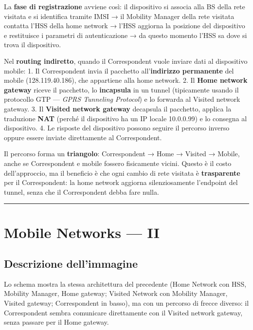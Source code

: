 \documentclass[
  italian,
  openany]{book}
\begin{document}
La \textbf{fase di registrazione} avviene così: il dispositivo si
associa alla BS della rete visitata e si identifica tramite IMSI → il
Mobility Manager della rete visitata contatta l'HSS della home network →
l'HSS aggiorna la posizione del dispositivo e restituisce i parametri di
autenticazione → da questo momento l'HSS sa dove si trova il
dispositivo.

Nel \textbf{routing indiretto}, quando il Correspondent vuole inviare
dati al dispositivo mobile: 1. Il Correspondent invia il pacchetto
all'\textbf{indirizzo permanente} del mobile (128.119.40.186), che
appartiene alla home network. 2. Il \textbf{Home network gateway} riceve
il pacchetto, lo \textbf{incapsula} in un tunnel (tipicamente usando il
protocollo GTP --- \emph{GPRS Tunneling Protocol}) e lo forwarda al
Visited network gateway. 3. Il \textbf{Visited network gateway}
decapsula il pacchetto, applica la traduzione \textbf{NAT} (perché il
dispositivo ha un IP locale 10.0.0.99) e lo consegna al dispositivo. 4.
Le risposte del dispositivo possono seguire il percorso inverso oppure
essere inviate direttamente al Correspondent.

Il percorso forma un \textbf{triangolo}: Correspondent → Home → Visited
→ Mobile, anche se Correspondent e mobile fossero fisicamente vicini.
Questo è il costo dell'approccio, ma il beneficio è che ogni cambio di
rete visitata è \textbf{trasparente} per il Correspondent: la home
network aggiorna silenziosamente l'endpoint del tunnel, senza che il
Correspondent debba fare nulla.

\begin{center}\rule{0.5\linewidth}{0.5pt}\end{center}

\section{Mobile Networks --- II}\label{mobile-networks-ii}

\subsection{Descrizione dell'immagine}\label{descrizione-dellimmagine-4}

Lo schema mostra la stessa architettura del precedente (Home Network con
HSS, Mobility Manager, Home gateway; Visited Network con Mobility
Manager, Visited gateway; Correspondent in basso), ma con un percorso di
frecce diverso: il Correspondent sembra comunicare direttamente con il
Visited network gateway, senza passare per il Home gateway.
\end{document}
